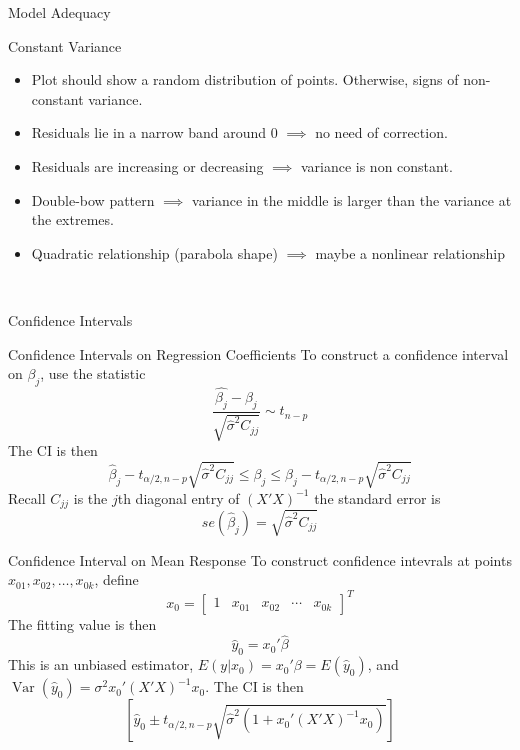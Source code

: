 \documentclass{article}
\DeclareMathOperator{\Var}{Var}
\begin{document}
\begin{multicols*}{3}
\begin{blackbox}{Model Adequacy}
\begin{redbox}{Constant Variance}
            \begin{itemize}[leftmargin=7pt]
                \item Plot should show a random distribution of points. Otherwise, signs of non-constant variance.
                \item Residuals lie in a narrow band around 0 $\implies$ no need of correction.
                \item Residuals are increasing or decreasing $\implies$ variance is non constant.
                \item Double-bow pattern $\implies$ variance in the middle is larger than the variance at the extremes.
                \item Quadratic relationship (parabola shape) $\implies$ maybe a nonlinear relationship
            \end{itemize}
        \end{redbox}\\[-2ex]
    \end{blackbox}
    \begin{blackbox}{Confidence Intervals}
        \begin{pinkbox}{Confidence Intervals on Regression Coefficients}
            To construct a confidence interval on $\beta_j$, use the statistic 
            \[\frac{\hat{\beta_j} - \beta_j}{\sqrt{\hat{\sigma}^2 C_{jj}}} \sim t_{n-p}\]
            The CI is then
            \[\hat{\beta}_j - t_{\alpha/2,n-p}\sqrt{\hat{\sigma}^2C_{jj}} \leq \beta_j \leq \hat{\beta}_j - t_{\alpha/2,n-p}\sqrt{\hat{\sigma}^2C_{jj}}\]
            Recall $C_{jj}$ is the $j$th diagonal entry of $(X'X)^{-1}$ the standard error is 
            \[se(\hat{\beta}_j) = \sqrt{\hat{\sigma}^2C_{jj}}\]
        \end{pinkbox}
        \begin{brownbox}{Confidence Interval on Mean Response}
            To construct confidence intevrals at points $x_{01}, x_{02}, \ldots, x_{0k}$, define 
            \renewcommand{\arraystretch}{1}
            \[x_0 = \begin{bmatrix}
                1 & x_{01} & x_{02} & \cdots & x_{0k}
            \end{bmatrix}^T\]
            The fitting value is then 
            \[\hat{y}_0 = x_0'\hat{\beta}\]
            This is an unbiased estimator, $E(y|x_0) = x_0'\beta=E(\hat{y}_0)$, and $\Var(\hat{y}_0) = \sigma^2x_0'(X'X)^{-1}x_0$. The CI is then 
            \[\left[\hat{y}_0 \pm t_{\alpha/2,n-p}\sqrt{\hat{\sigma}^2(1  + x_0'(X'X)^{-1}x_0)}\right]\]
        \end{brownbox}

\end{blackbox}
\end{multicols*}
\end{document}
